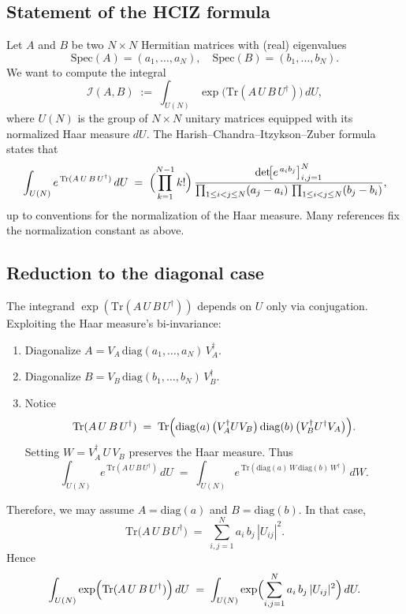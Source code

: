 \documentclass[letterpaper,11pt,oneside,reqno]{article}
\numberwithin{equation}{section}
\theoremstyle{definition}
\begin{document}
\subsection{Statement of the HCIZ formula}

Let \(A\) and \(B\) be two \(N\times N\) Hermitian matrices with (real) eigenvalues
\[
   \mathrm{Spec}(A) = (a_1,\dots,a_N),
   \quad
   \mathrm{Spec}(B) = (b_1,\dots,b_N).
\]
We want to compute the integral
\[
   \mathcal{I}(A,B)
   \;:=\;
   \int_{U(N)}
   \exp\bigl(\mathrm{Tr}(A\,U\,B\,U^\dagger)\bigr)
   \,dU,
\]
where \(U(N)\) is the group of \(N\times N\) unitary matrices equipped with its normalized Haar measure \(dU\).
The Harish--Chandra--Itzykson--Zuber formula states that
\[
   \int_{U(N)}
   e^{\,\mathrm{Tr}(A\,U\,B\,U^\dagger)}
   \,dU
   \;=\;
   \Bigl(\prod_{k=1}^{N-1} k!\Bigr)\,
   \frac{\det\!\bigl[e^{\,a_i b_j}\bigr]_{i,j=1}^N}{\prod_{1\le i<j\le N}(a_j-a_i)\,\prod_{1\le i<j\le N}(b_j-b_i)},
\]
up to conventions for the normalization of the Haar measure. Many references fix
the normalization constant
as above.

\subsection{Reduction to the diagonal case}

The integrand \(\exp(\mathrm{Tr}(A\,U\,B\,U^\dagger))\) depends on \(U\) only via conjugation.  Exploiting the Haar measure's bi-invariance:

\begin{enumerate}
   \item Diagonalize \(A = V_A\,\mathrm{diag}(a_1,\dots,a_N)\,V_A^\dagger\).
   \item Diagonalize \(B = V_B\,\mathrm{diag}(b_1,\dots,b_N)\,V_B^\dagger\).
   \item Notice
   \[
      \mathrm{Tr}(A\,U\,B\,U^\dagger)
      \;=\;
      \mathrm{Tr}\Bigl(\mathrm{diag}(a)\,\bigl(V_A^\dagger U V_B\bigr)\,\mathrm{diag}(b)\,\bigl(V_B^\dagger U^\dagger V_A\bigr)\Bigr).
   \]
   Setting \(W=V_A^\dagger\,U\,V_B\) preserves the Haar measure.  Thus
   \[
      \int_{U(N)} e^{\,\mathrm{Tr}(A\,U\,B\,U^\dagger)}\,dU
      \;=\;
      \int_{U(N)}
      e^{\,\mathrm{Tr}(\mathrm{diag}(a)\,W\,\mathrm{diag}(b)\,W^\dagger)}\,dW.
   \]
\end{enumerate}
Therefore, we may assume \(A=\mathrm{diag}(a)\) and \(B=\mathrm{diag}(b)\).  In that case,
\[
   \mathrm{Tr}\bigl(A\,U\,B\,U^\dagger\bigr)
   \;=\;
   \sum_{i,j=1}^N a_i\,b_j\,|U_{ij}|^2.
\]
Hence
\begin{equation}
	\label{eq:HCIZ_to_compute}
   \int_{U(N)}
   \exp\Bigl(\mathrm{Tr}(A\,U\,B\,U^\dagger)\Bigr)\,dU
   \;=\;
   \int_{U(N)}
   \exp\Bigl(\sum_{i,j=1}^N a_i\,b_j\,|U_{ij}|^2\Bigr)\,dU.
 \end{equation}
\end{document}
